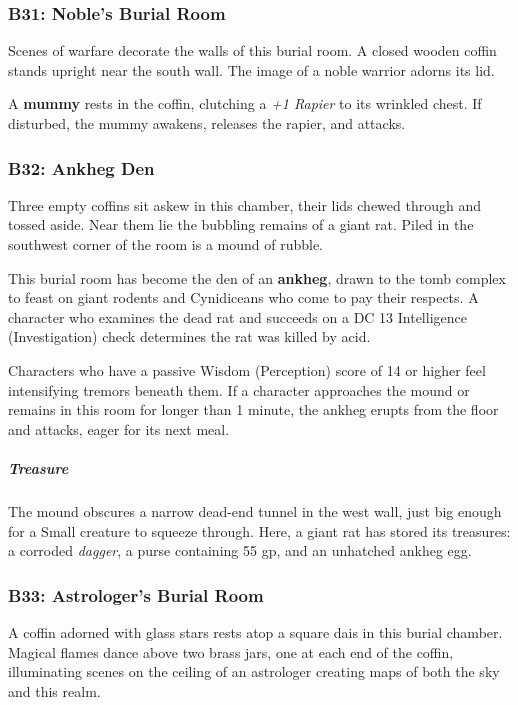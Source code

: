 \documentclass[10pt,a4paper,twoside,bg=print,twocolumn,openany,nodeprecatedcode]{dndbook}
\begin{document}
\subsubsection{B31: Noble's Burial Room}
\begin{DndReadAloud}{}
Scenes of warfare decorate the walls of this burial room. A closed wooden coffin stands upright near the south wall. The image of a noble warrior adorns its lid.

\end{DndReadAloud}

A \textbf{mummy} rests in the coffin, clutching a \textit{+1 Rapier} to its wrinkled chest. If disturbed, the mummy awakens, releases the rapier, and attacks.

\subsubsection{B32: Ankheg Den}
\begin{DndReadAloud}{}
Three empty coffins sit askew in this chamber, their lids chewed through and tossed aside. Near them lie the bubbling remains of a giant rat. Piled in the southwest corner of the room is a mound of rubble.

\end{DndReadAloud}

This burial room has become the den of an \textbf{ankheg}, drawn to the tomb complex to feast on giant rodents and Cynidiceans who come to pay their respects. A character who examines the dead rat and succeeds on a DC 13 Intelligence (Investigation) check determines the rat was killed by acid.

Characters who have a passive Wisdom (Perception) score of 14 or higher feel intensifying tremors beneath them. If a character approaches the mound or remains in this room for longer than 1 minute, the ankheg erupts from the floor and attacks, eager for its next meal.

\subparagraph{Treasure}
The mound obscures a narrow dead-end tunnel in the west wall, just big enough for a Small creature to squeeze through. Here, a giant rat has stored its treasures: a corroded \textit{dagger}, a purse containing 55 gp, and an unhatched ankheg egg.

\subsubsection{B33: Astrologer's Burial Room}
\begin{DndReadAloud}{}
A coffin adorned with glass stars rests atop a square dais in this burial chamber. Magical flames dance above two brass jars, one at each end of the coffin, illuminating scenes on the ceiling of an astrologer creating maps of both the sky and this realm.

\end{DndReadAloud}
\end{document}
